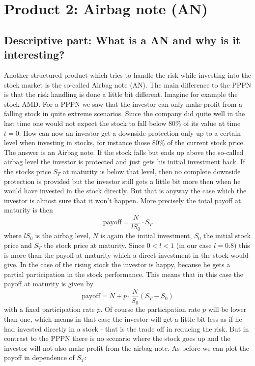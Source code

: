 \documentclass[11pt,oneside,a4paper]{article}
\begin{document}
	\section{Product 2: Airbag note (AN)}
	\subsection{Descriptive part: What is a AN and why is it interesting?}
	Another structured product which tries to handle the risk while investing into the stock market is the so-called Airbag note (AN). The main difference to the PPPN is that the risk handling is done a little bit different. Imagine for example the stock AMD. 	For a PPPN we saw that the investor can only make profit from a falling stock in quite extreme scenarios.
	Since the company did quite well in the last time one would not expect the stock to fall below $ 80 \% $ of its value at time $ t=0 $. How can now an investor get a downside protection only  up to a certain level when investing in stocks, for instance those $ 80\% $ of the current stock price. The answer is an Airbag note. If the stock falls but ends up above the so-called airbag level the investor is protected and just gets his initial investment back.
	If the stocks price $ S_T $ at maturity is below that level, then no complete downside protection is provided but the investor still gets a little bit more then when he would have invested in the stock directly. But that is anyway the case which the investor is almost sure that it won't happen. More precisely the total payoff at maturity is then 
	\[
		\text{payoff} = \frac{N}{l S_0}\cdot S_T
	\]
	 where $ l S_0 $ is the airbag level, $ N $ is again the initial investment, $ S_0 $ the initial stock price and $ S_T $ the stock price at maturity. Since $ 0<l<1 $ (in our case $ l=0.8 $) this is more than the payoff at maturity which a direct investment in the stock would give.
	 In the case of the rising stock the investor is happy, because he gets a partial participation in the stock performance. This means that in this case the payoff at maturity is given by
	 \[
	 	\text{payoff} = N + p \cdot \frac{N}{S_0}(S_T - S_0)
	 \] 
	 with a fixed participation rate $ p $. Of course the participation rate $ p $ will be lower than one, which means in that case the investor will get a little bit less as if he had invested directly in a stock - that is the trade off in reducing the risk. But in contrast to the PPPN there is no scenario where the stock goes up and the investor will not also make profit from the airbag note.
	 As before we can plot the payoff in dependence of $ S_T $:
\end{document}
